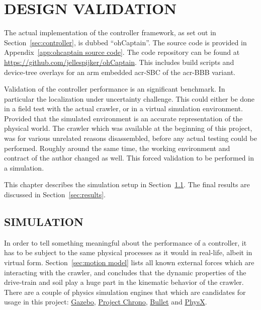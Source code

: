 

\chapter{DESIGN VALIDATION}\label{chap:design validation}

The actual implementation of the controller framework, as set out in Section~\ref{sec:controller}, is dubbed
``ohCaptain''. The source code is provided in Appendix~\ref{app:ohcaptain source code}. The code repository can be found
at \url{https://github.com/jellespijker/ohCaptain}. This includes build scripts and device-tree overlays for an arm
embedded \gls{acr-SBC} of the \gls{acr-BBB} variant.

Validation of the controller performance is an significant benchmark. In particular the localization under uncertainty
challenge. This could either be done in a field test with the actual crawler, or in a virtual simulation environment.
Provided that the simulated environment is an accurate representation of the physical world. The crawler which was
available at the beginning of this project, was for various unrelated reasons disassembled, before any actual testing
could be performed. Roughly around the same time, the working environment and contract of the author changed as well.
This forced validation to be performed in a simulation.

\noindent This chapter describes the simulation setup in Section~\ref{sec:simulation}. The final results are discussed
in Section~\ref{sec:results}.


\section{SIMULATION}\label{sec:simulation}

In order to tell something meaningful about the performance of a controller, it has to be subject to the same physical
processes as it would in real-life, albeit in virtual form. Section~\ref{sec:motion model} lists all known external
forces which are interacting with the crawler, and concludes that the dynamic properties of the drive-train and soil
play a huge part in the kinematic behavior of the crawler. There are a couple of physics simulation engines that which
are candidates for usage in this project:  \href{http://gazebosim.org/}{Gazebo},
\href{https://projectchrono.org/}{Project Chrono}, \href{https://pybullet.org/wordpress/}{Bullet} and
\href{https://developer.nvidia.com/gameworks-physx-overview}{PhysX}.

